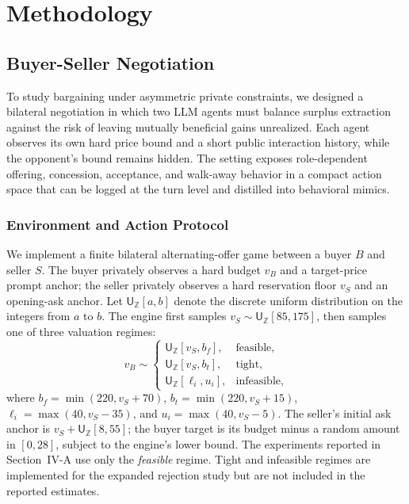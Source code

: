 \documentclass[conference]{IEEEtran}
\begin{document}
\section{Methodology}


\subsection{Buyer-Seller Negotiation}

To study bargaining under asymmetric private constraints, we designed a bilateral negotiation in which two LLM agents must balance surplus extraction against the risk of leaving mutually beneficial gains unrealized. Each agent observes its own hard price bound and a short public interaction history, while the opponent's bound remains hidden. The setting exposes role-dependent offering, concession, acceptance, and walk-away behavior in a compact action space that can be logged at the turn level and distilled into behavioral mimics.

\subsubsection{Environment and Action Protocol}

We implement a finite bilateral alternating-offer game between a buyer $B$ and seller $S$. The buyer privately observes a hard budget $v_B$ and a target-price prompt anchor; the seller privately observes a hard reservation floor $v_S$ and an opening-ask anchor. Let $\mathsf{U}_{\mathbb{Z}}[a,b]$ denote the discrete uniform distribution on the integers from $a$ to $b$. The engine first samples $v_S\sim\mathsf{U}_{\mathbb{Z}}[85,175]$, then samples one of three valuation regimes:
\begin{equation}
v_B\sim
\begin{cases}
\mathsf{U}_{\mathbb{Z}}[v_S,b_f], & \text{feasible},\\
\mathsf{U}_{\mathbb{Z}}[v_S,b_t], & \text{tight},\\
\mathsf{U}_{\mathbb{Z}}[\ell_i,u_i], & \text{infeasible},
\end{cases}
\end{equation}
where $b_f=\min(220,v_S+70)$, $b_t=\min(220,v_S+15)$, $\ell_i=\max(40,v_S-35)$, and $u_i=\max(40,v_S-5)$. The seller's initial ask anchor is $v_S+\mathsf{U}_{\mathbb{Z}}[8,55]$; the buyer target is its budget minus a random amount in $[0,28]$, subject to the engine's lower bound. The experiments reported in Section~IV-A use only the \emph{feasible} regime. Tight and infeasible regimes are implemented for the expanded rejection study but are not included in the reported estimates.
\end{document}
